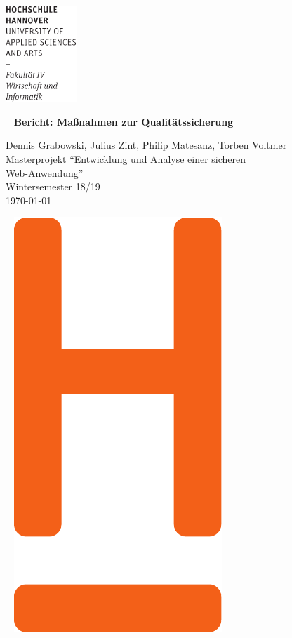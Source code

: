 \documentclass[12pt,DIV14,BCOR10mm,a4paper,parskip=half-,headsepline,headinclude,english,ngerman,bibliography=totocnumbered]{scrreprt}
\begin{document}
  \thispagestyle{empty} %
\includegraphics[width=0.2\textwidth]{Wortmarke_WI_schwarz}

   {  ~ \sffamily
  \vfill
  {\Huge\bfseries Bericht: Maßnahmen zur Qualitätssicherung}
  \bigskip

  {\Large
  Dennis Grabowski, Julius Zint, Philip Matesanz, Torben Voltmer \\[2ex]
  Masterprojekt \enquote{Entwicklung und Analyse einer sicheren \\Web-Anwendung} \\
  Wintersemester 18/19
 \\[5ex]
   \today }
}
 \vfill

  ~ \hfill
  \includegraphics[height=0.3\paperheight]{H_WI_Pantone1665}
\end{document}
